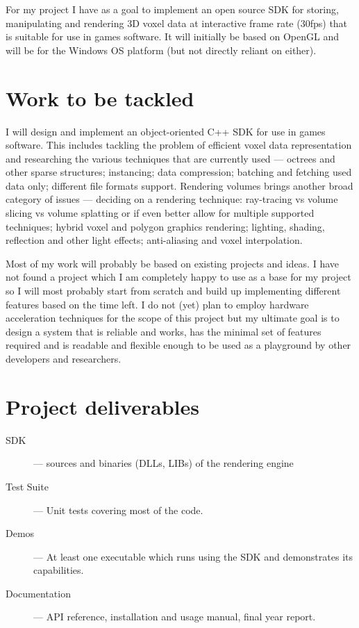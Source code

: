 \documentclass[11pt,fleqn,twoside]{article}
\begin{document}
For my project I have as a goal to implement an open source SDK for storing, manipulating and rendering 3D voxel data at interactive frame rate (30fps) that is suitable for use in games software. It will initially be based on OpenGL and will be for the Windows OS platform (but not directly reliant on either).

\section{Work to be tackled}
I will design and implement an object-oriented C++ SDK for use in games software. This includes tackling the problem of efficient voxel data representation and researching the various techniques that are currently used --- octrees and other sparse structures; instancing; data compression; batching and fetching used data only; different file formats support. Rendering volumes brings another broad category of issues --- deciding on a rendering technique: ray-tracing vs volume slicing vs volume splatting or if even better allow for multiple supported techniques; hybrid voxel and polygon graphics rendering; lighting, shading, reflection and other light effects; anti-aliasing and voxel interpolation.

Most of my work will probably be based on existing projects and ideas. I have not found a project which I am completely happy to use as a base for my project so I will most probably start from scratch and build up implementing different features based on the time left. I do not (yet) plan to employ hardware acceleration techniques for the scope of this project but my ultimate goal is to design a system that is reliable and works, has the minimal set of features required and is readable and flexible enough to be used as a playground by other developers and researchers.


\section{Project deliverables}
\begin{description}
\item[SDK]			--- sources and binaries (DLLs, LIBs) of the rendering engine
\item[Test Suite]	--- Unit tests covering most of the code.
\item[Demos]		--- At least one executable which runs using the SDK and demonstrates its capabilities.
\item[Documentation]--- API reference, installation and usage manual, final year report.
\end{description}
\end{document}
